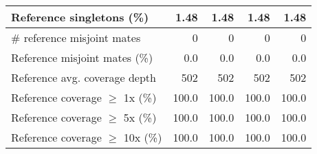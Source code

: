 \documentclass[12pt,a4paper]{article}
\begin{document}
\begin{table}[ht]
\begin{center}
\begin{tabular}{|l*{4}{|r}|}
Reference singletons (\%) & 1.48 & 1.48 & 1.48 & 1.48 \\ \hline
\# reference misjoint mates & 0 & 0 & 0 & 0 \\ \hline
Reference misjoint mates (\%) & 0.0 & 0.0 & 0.0 & 0.0 \\ \hline
Reference avg. coverage depth & 502 & 502 & 502 & 502 \\ \hline
Reference coverage $\geq$ 1x (\%) & 100.0 & 100.0 & 100.0 & 100.0 \\ \hline
Reference coverage $\geq$ 5x (\%) & 100.0 & 100.0 & 100.0 & 100.0 \\ \hline
Reference coverage $\geq$ 10x (\%) & 100.0 & 100.0 & 100.0 & 100.0 \\ \hline
\end{tabular}
\end{center}
\end{table}
\end{document}
